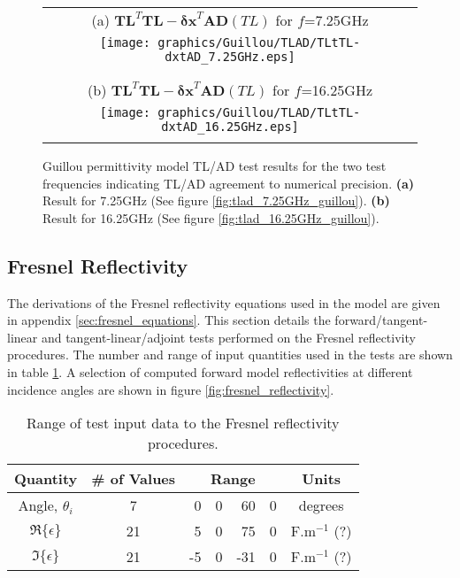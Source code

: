 \begin{figure}[htp]
  \centering
  \begin{tabular}{c}
    \textsf{(a) $\mathbf{TL}^{T}\mathbf{TL} - \mathbf{\delta x}^{T}\mathbf{AD}(TL)$ for $f$=7.25GHz}\\
    \texttt{[image: graphics/Guillou/TLAD/TLtTL-dxtAD\_7.25GHz.eps]}\\\\\\
    \textsf{(b) $\mathbf{TL}^{T}\mathbf{TL} - \mathbf{\delta x}^{T}\mathbf{AD}(TL)$ for $f$=16.25GHz}\\
    \texttt{[image: graphics/Guillou/TLAD/TLtTL-dxtAD\_16.25GHz.eps]}\\\\
  \end{tabular}
  \caption{Guillou permittivity model TL/AD test results for the two test frequencies indicating TL/AD agreement to numerical precision. \textbf{(a)} Result for 7.25GHz (See figure \ref{fig:tlad_7.25GHz_guillou}). \textbf{(b)} Result for 16.25GHz (See figure \ref{fig:tlad_16.25GHz_guillou}).}
  \label{fig:tlad_test_guillou}
\end{figure}



\subsection{Fresnel Reflectivity}
The derivations of the Fresnel reflectivity equations used in the model are given in appendix \ref{sec:fresnel_equations}. This section details the forward/tangent-linear and tangent-linear/adjoint tests performed on the Fresnel reflectivity procedures. The number and range of input quantities used in the tests are shown in table \ref{tab:fresnel_input_range}. A selection of computed forward model reflectivities at different incidence angles are shown in figure \ref{fig:fresnel_reflectivity}.
\begin{table}[htp]
  \centering
  \begin{tabular}{| c | c | r@{.}l@{ - }r@{.}l | c |}
    \hline
    \textbf{Quantity} & \textbf{\# of Values} & \multicolumn{4}{c|}{\textbf{Range}} & \textbf{Units} \\
    \hline\hline
    Angle, $\theta_i$ &  7 &  0&0 &  60&0 & degrees \\
    $\Re\{\epsilon\}$ & 21 &  5&0 &  75&0 & F.m$^{-1}$ (?) \\
    $\Im\{\epsilon\}$ & 21 & -5&0 & -31&0 & F.m$^{-1}$ (?) \\
    \hline
  \end{tabular}
  \caption{Range of test input data to the Fresnel reflectivity procedures.}
  \label{tab:fresnel_input_range}
\end{table}

